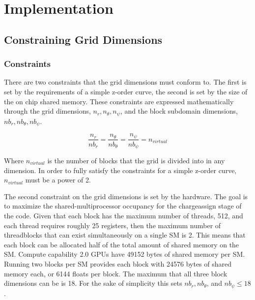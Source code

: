 \chapter{Implementation}

	\section{Constraining Grid Dimensions}
		\subsection{Constraints}
There are two constraints that the grid dimensions must conform to. The first is set by the requirements of a simple z-order curve, the second is set by the size of the on chip shared memory. These constraints are expressed mathematically through the grid dimensions, $n_r, n_{\theta}, n_{\psi}$, and the block subdomain dimensions, $nb_r, nb_{\theta}, nb_{\psi}$.
		
\begin{equation}
\frac{n_r}{nb_r} = \frac{n_{\theta}}{nb_{\theta}} = \frac{n_{\psi}}{nb_{\psi}} = n_{virtual}
\end{equation} 

Where $n_{virtual}$ is the number of blocks that the grid is divided into in any dimension. In order to fully satisfy the constraints for a simple z-order curve, $n_{virtual}$ must be a power of 2.

The second constraint on the grid dimensions is set by the hardware. The goal is to maximize the shared-multiprocessor occupancy for the chargeassign stage of the code. Given that each block has the maximum number of threads, 512, and each thread requires roughly 25 registers, then the maximum number of threadblocks that can exist simultaneously on a single SM is 2. This means that each block can be allocated half of the total amount of shared memory on the SM. Compute capability 2.0 GPUs have 49152 bytes of shared memory per SM. Running two blocks per SM provides each block with 24576 bytes of shared memory each, or 6144 floats per block. The maximum that all three block dimensions can be is 18. For the sake of simplicity this sets $nb_r, nb_{\theta}$, and $nb_{\psi} \le 18$. 

